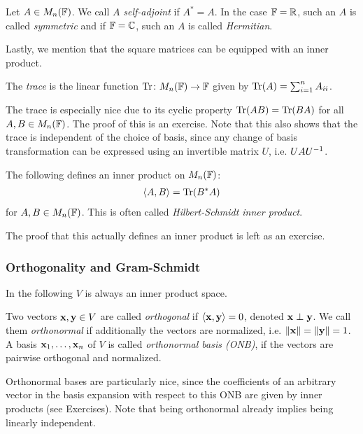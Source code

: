 \documentclass{article}
\begin{document}
\begin{definition}
Let $A\in M_n({\mathbb{F}})$. We call $A$ \emph{self-adjoint} if $A^* = A$. In the case ${\mathbb{F}} = {\mathbb{R}}$, such an $A$ is called \emph{symmetric} and if ${\mathbb{F}} = {\mathbb{C}}$, such an $A$ is called \emph{Hermitian}.
\end{definition}


Lastly, we mention that the square matrices can be equipped with an inner product. 

\begin{definition}
The \emph{trace} is the linear function $\mathrm{Tr} \colon M_n({\mathbb{F}}) \to {\mathbb{F}}$ given by $\mathrm{Tr}(A) = \sum_{i=1}^n A_{ii}$.
\end{definition}

The trace is especially nice due to its cyclic property $\mathrm{Tr}(AB) = \mathrm{Tr}(BA)$ for all $A,B\in M_n({\mathbb{F}})$. The proof of this is an exercise. Note that this also shows that the trace is independent of the choice of basis, since any change of basis transformation can be expressed using an invertible matrix $U$, i.e. $UAU^{-1}$.

\begin{proposition}
The following defines an inner product on $M_n({\mathbb{F}})$:
\begin{align*}
    \langle A,B \rangle = \mathrm{Tr}(B^*A)
\end{align*}
for $A,B\in M_n({\mathbb{F}})$. This is often called \emph{Hilbert-Schmidt inner product}.
\end{proposition}

The proof that this actually defines an inner product is left as an exercise. 

\subsubsection{Orthogonality and Gram-Schmidt}
In the following $V$ is always an inner product space. 

\begin{definition}
Two vectors ${\mathbf{x}},{\mathbf{y}} \in V$ are called \emph{orthogonal} if $\langle {\mathbf{x}},{\mathbf{y}} \rangle = 0$, denoted ${\mathbf{x}} \perp {\mathbf{y}}$. We call them \emph{orthonormal} if additionally the vectors are normalized, i.e. $\Vert {\mathbf{x}} \Vert =\Vert {\mathbf{y}}\Vert = 1 $. A basis ${\mathbf{x}}_1,\ldots, {\mathbf{x}}_n$ of $V$ is called \emph{orthonormal basis (ONB)}, if the vectors are pairwise orthogonal and normalized.  
\end{definition}

Orthonormal bases are particularly nice, since the coefficients of an arbitrary vector in the basis expansion with respect to this ONB are given by inner products (see Exercises). Note that being orthonormal already implies being linearly independent.
\end{document}
